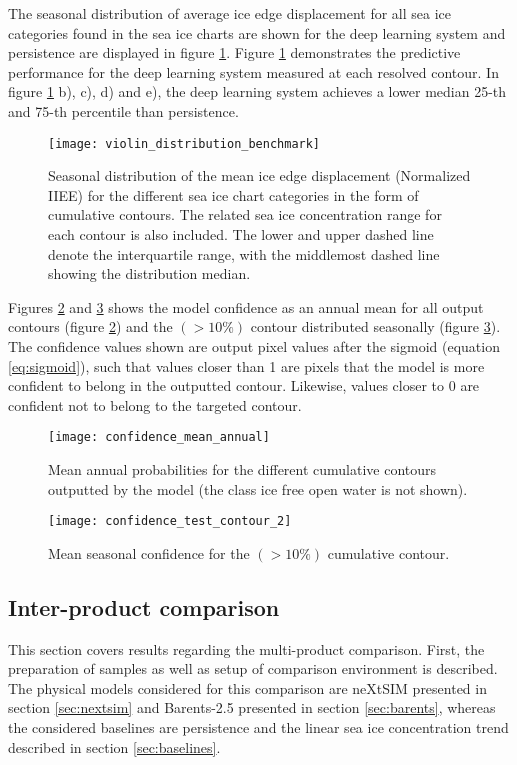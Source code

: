 \documentclass[../main/thesis.tex]{subfiles}
\begin{document}
The seasonal distribution of average ice edge displacement for all sea ice categories found in the sea ice charts are shown for the deep learning system and persistence are displayed in figure \ref{fig:violins}. Figure \ref{fig:violins} demonstrates the predictive performance for the deep learning system measured at each resolved contour. In figure \ref{fig:violins} b), c), d) and e), the deep learning system achieves a lower median 25-th and 75-th percentile than persistence.

\begin{figure}
    \centering
    \texttt{[image: violin\_distribution\_benchmark]}
    \caption{\label{fig:violins}Seasonal distribution of the mean ice edge displacement (Normalized IIEE) for the different sea ice chart categories in the form of cumulative contours. The related sea ice concentration range for each contour is also included. The lower and upper dashed line denote the interquartile range, with the middlemost dashed line showing the distribution median.}
\end{figure}

Figures \ref{fig:mean_annual_confidence} and \ref{fig:confidence_seasonal} shows the model confidence as an annual mean for all output contours (figure \ref{fig:mean_annual_confidence}) and the $(> 10\%)$ contour distributed seasonally (figure \ref{fig:confidence_seasonal}). The confidence values shown are output pixel values after the sigmoid (equation \ref{eq:sigmoid}), such that values closer than 1 are pixels that the model is more confident to belong in the outputted contour. Likewise, values closer to 0 are confident not to belong to the targeted contour.

\begin{figure}
    \centering
    \texttt{[image: confidence\_mean\_annual]}
    \caption{\label{fig:mean_annual_confidence}Mean annual probabilities for the different cumulative contours outputted by the model (the class ice free open water is not shown).}
\end{figure}

\begin{figure}
    \centering
    \texttt{[image: confidence\_test\_contour\_2]}
    \caption{\label{fig:confidence_seasonal}Mean seasonal confidence for the $(> 10\%)$ cumulative contour.}
\end{figure}



\subsection{Inter-product comparison}
This section covers results regarding the multi-product comparison. First, the preparation of samples as well as setup of comparison environment is described. The physical models considered for this comparison are neXtSIM \citep{Williams2021} presented in section \ref{sec:nextsim} and Barents-2.5 \citep{Roehrs2022} presented in section \ref{sec:barents}, whereas the considered baselines are persistence and the linear sea ice concentration trend described in section \ref{sec:baselines}. 
\end{document}
